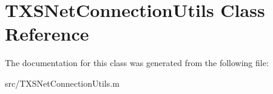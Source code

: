 \hypertarget{class_t_x_s_net_connection_utils}{}\section{T\+X\+S\+Net\+Connection\+Utils Class Reference}
\label{class_t_x_s_net_connection_utils}


The documentation for this class was generated from the following file\+:\begin{DoxyCompactItemize}
\item 
src/T\+X\+S\+Net\+Connection\+Utils.\+m\end{DoxyCompactItemize}

